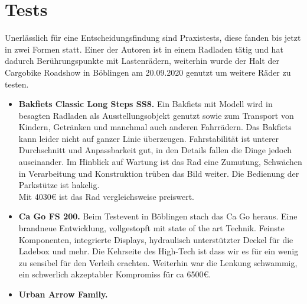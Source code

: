 \documentclass[a4paper,ngerman, 14pt] {scrartcl}
\begin{document}
\section{Tests}
Unerlässlich für eine Entscheidungsfindung sind Praxistests, diese fanden bis jetzt in zwei Formen statt. Einer der Autoren ist in einem Radladen tätig und hat dadurch Berührungspunkte mit Lastenrädern, weiterhin wurde der Halt der Cargobike Roadshow in Böblingen am 20.09.2020 genutzt um weitere Räder zu testen.
\begin{itemize}
    \item \textbf{Bakfiets Classic Long Steps SS8.} Ein Bakfiets mit Modell wird in besagten Radladen als Ausstellungsobjekt genutzt sowie zum Transport von Kindern, Getränken und manchmal auch anderen Fahrrädern. Das Bakfiets kann leider nicht auf ganzer Linie überzeugen. Fahrstabilität ist unterer Durchschnitt und Anpassbarkeit gut, in den Details fallen die Dinge jedoch auseinander. Im Hinblick auf Wartung ist das Rad eine Zumutung, Schwächen in Verarbeitung und Konstruktion trüben das Bild weiter. Die Bedienung der Parkstütze ist hakelig.\\ Mit 4030€ ist das Rad vergleichsweise preiswert.
    \item \textbf{Ca Go FS 200.} Beim Testevent in Böblingen stach das Ca Go heraus. Eine brandneue Entwicklung, vollgestopft mit state of the art Technik. Feinste Komponenten, integrierte Displays, hydraulisch unterstützter Deckel für die Ladebox und mehr. Die Kehrseite des High-Tech ist dass wir es für ein wenig zu sensibel für den Verleih erachten. Weiterhin war die Lenkung schwammig, ein schwerlich akzeptabler Kompromiss für ca 6500€.
    \item \textbf{Urban Arrow Family.}
\end{itemize}
\end{document}
